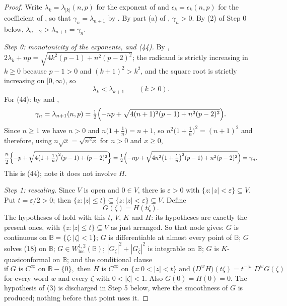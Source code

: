 \begin{proof}
Write $\lambda_k=\lambda_{|k|}(n,p)$ for the exponent of 
and $\epsilon_k=\epsilon_k(n,p)$ for the coefficient of , so
that $\gamma_n=\lambda_{n+1}$ by .  By part (a) of
, $\gamma_n>0$.  By (2) of Step 0 below,
$\lambda_{n+2}>\lambda_{n+1}=\gamma_n$.

\emph{Step 0: monotonicity of the exponents, and (44).}  By
,
$2\lambda_k+np=\sqrt{4k^2(p-1)+n^2(p-2)^2}$; the radicand is strictly
increasing in $k\ge0$ because $p-1>0$ and $(k+1)^2>k^2$, and the square root is
strictly increasing on $[0,\infty)$, so
\begin{equation}\tag{2}
  \lambda_k<\lambda_{k+1}\qquad(k\ge0).
\end{equation}
For (44): by  and ,
\[
  \gamma_n=\lambda_{n+1}(n,p)
  =\tfrac12\Bigl(-np+\sqrt{4(n+1)^2(p-1)+n^2(p-2)^2}\Bigr).
\]
Since $n\ge1$ we have $n>0$ and $n\bigl(1+\tfrac1n\bigr)=n+1$, so
$n^2\bigl(1+\tfrac1n\bigr)^2=(n+1)^2$ and therefore, using $n\sqrt{x}=\sqrt{n^2x}$
for $n>0$ and $x\ge0$,
\[
  \frac n2\Bigl\{-p+\sqrt{4\bigl(1+\tfrac1n\bigr)^2(p-1)+(p-2)^2}\Bigr\}
  =\tfrac12\Bigl(-np+\sqrt{4n^2\bigl(1+\tfrac1n\bigr)^2(p-1)+n^2(p-2)^2}\Bigr)
  =\gamma_n .
\]
This is (44); note it does not involve $H$.

\emph{Step 1: rescaling.}  Since $V$ is open and $0\in V$, there is
$\varepsilon>0$ with $\{z:|z|<\varepsilon\}\subseteq V$.  Put
$t=\varepsilon/2>0$; then $\{z:|z|\le t\}\subseteq\{z:|z|<\varepsilon\}
\subseteq V$.  Define
\[
  G(\zeta)=H(t\zeta).
\]
The hypotheses of  hold with this $t$, $V$, $K$ and $H$:
its hypotheses are exactly the present ones, with
$\{z:|z|\le t\}\subseteq V$ as just arranged.  So that node gives: $G$ is
continuous on $\mathbb{B}=\{\zeta:|\zeta|<1\}$; $G$ is differentiable at almost
every point of $\mathbb{B}$; $G$ solves (18) on $\mathbb{B}$; $G\in
W^{1,2}_{\mathrm{loc}}(\mathbb{B})$; $|G_\zeta|^2+|G_{\bar\zeta}|^2$ is
integrable on $\mathbb{B}$; $G$ is $K$-quasiconformal on $\mathbb{B}$; and the
conditional clause
\begin{equation}\tag{3}
  \text{if }G\text{ is }C^\infty\text{ on }\mathbb{B}-\{0\},\text{ then }
  H\text{ is }C^\infty\text{ on }\{z:0<|z|<t\}\text{ and }
  \bigl(D^{w}H\bigr)(t\zeta)=t^{-|w|}D^{w}G(\zeta)
\end{equation}
for every word $w$ and every $\zeta$ with $0<|\zeta|<1$.  Also
$G(0)=H(0)=0$.  The hypothesis of (3) is discharged in Step 5 below, where the
smoothness of $G$ is produced; nothing before that point uses it.


\end{proof}
